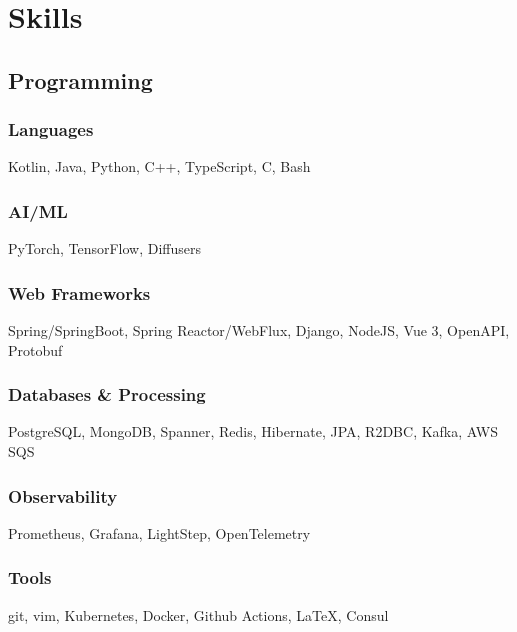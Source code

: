\documentclass[]{two-column-resume}
\begin{document}
{\begin{minipage}[t]{0.34\textwidth}
%
\section{Skills}
\setlength{\parindent}{3ex}

\subsection{Programming}
    \subsubsection{Languages}
            Kotlin, 
            Java, 
            Python, 
            C++, 
            TypeScript, 
            C, 
            Bash
        \newline
    \subsubsection{AI/ML}
            PyTorch, 
            TensorFlow, 
            Diffusers
        \newline
    \subsubsection{Web Frameworks}
            Spring/SpringBoot, 
            Spring Reactor/WebFlux, 
            Django, 
            NodeJS, 
            Vue 3, 
            OpenAPI, 
            Protobuf
        \newline
    \subsubsection{Databases \& Processing}
            PostgreSQL, 
            MongoDB, 
            Spanner, 
            Redis, 
            Hibernate, 
            JPA, 
            R2DBC, 
            Kafka, 
            AWS SQS
        \newline
    \subsubsection{Observability}
            Prometheus, 
            Grafana, 
            LightStep, 
            OpenTelemetry
        \newline
    \subsubsection{Tools}
            git, 
            vim, 
            Kubernetes, 
            Docker, 
            Github Actions, 
            LaTeX, 
            Consul
        \newline
\sectionsep


\end{minipage}}
\end{document}
